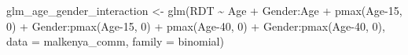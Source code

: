 \documentclass[
  letterpaper,
]{krantz}
\newenvironment{Shaded}{\begin{snugshade}}{\end{snugshade}}
\newcommand{\AttributeTok}[1]{\textcolor[rgb]{0.40,0.45,0.13}{#1}}
\newcommand{\DecValTok}[1]{\textcolor[rgb]{0.68,0.00,0.00}{#1}}
\newcommand{\FunctionTok}[1]{\textcolor[rgb]{0.28,0.35,0.67}{#1}}
\newcommand{\NormalTok}[1]{\textcolor[rgb]{0.00,0.23,0.31}{#1}}
\newcommand{\OtherTok}[1]{\textcolor[rgb]{0.00,0.23,0.31}{#1}}
\newcommand{\SpecialCharTok}[1]{\textcolor[rgb]{0.37,0.37,0.37}{#1}}
\begin{document}
\begin{Shaded}
\begin{Highlighting}[]
\NormalTok{glm\_age\_gender\_interaction }\OtherTok{\textless{}{-}} \FunctionTok{glm}\NormalTok{(RDT }\SpecialCharTok{\textasciitilde{}}\NormalTok{ Age }\SpecialCharTok{+}\NormalTok{ Gender}\SpecialCharTok{:}\NormalTok{Age }\SpecialCharTok{+} 
                                  \FunctionTok{pmax}\NormalTok{(Age}\DecValTok{{-}15}\NormalTok{, }\DecValTok{0}\NormalTok{) }\SpecialCharTok{+}\NormalTok{ Gender}\SpecialCharTok{:}\FunctionTok{pmax}\NormalTok{(Age}\DecValTok{{-}15}\NormalTok{, }\DecValTok{0}\NormalTok{) }\SpecialCharTok{+} 
                                  \FunctionTok{pmax}\NormalTok{(Age}\DecValTok{{-}40}\NormalTok{, }\DecValTok{0}\NormalTok{) }\SpecialCharTok{+}\NormalTok{ Gender}\SpecialCharTok{:}\FunctionTok{pmax}\NormalTok{(Age}\DecValTok{{-}40}\NormalTok{, }\DecValTok{0}\NormalTok{),}
                              \AttributeTok{data =}\NormalTok{ malkenya\_comm, }\AttributeTok{family =}\NormalTok{ binomial)}


\end{Highlighting}
\end{Shaded}
\end{document}
